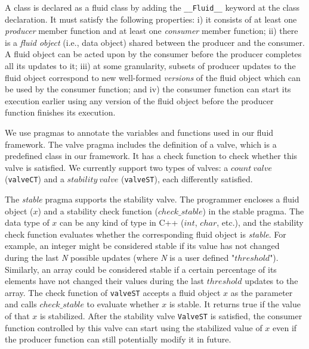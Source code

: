 A class is declared as a fluid class by adding the \texttt{\_\_Fluid\_\_} keyword at the class declaration. It must satisfy the following properties: i) it consists of at least one \textit{producer} member function and at least one \textit{consumer} member function; ii) there is a \textit{fluid object} (i.e., data object) shared between the producer and the consumer. A fluid object can be acted upon by the consumer before the producer completes all its updates to it; iii) at some granularity, subsets of producer updates to the fluid object correspond to new well-formed {\it versions} of the fluid object which can be used by the consumer function; and iv) the consumer function can start its execution earlier using any version of the fluid object before the producer function finishes its execution. 

 We use pragmas to annotate the variables and functions used in our fluid framework. The valve pragma includes the definition of a valve, which is a predefined class in our framework. It has a check function to check whether this valve is satisfied. We currently support two types of valves: a $count\ valve$ ({\tt valveCT}) and a $stability\ valve$ ({\tt valveST}), each differently satisfied.


The \textit{stable} pragma supports the stability valve. The programmer encloses a fluid object ($x$) and a stability check function ($check\_stable$) in the stable pragma. The data type of $x$ can be any kind of type in C++ ($int$, $char$, etc.), and the stability check function evaluates whether the corresponding fluid object is \textit{stable}. For example, an integer might be considered stable if its value has not changed during the last \textit{N} possible updates (where \textit{N} is a user defined "$threshold$"). Similarly, an array could be considered stable if a certain percentage of its elements have not changed their values during the last $threshold$ updates to the array. The check function of {\tt valveST} accepts a fluid object $x$ as the parameter and calls $check\_stable$ to evaluate whether $x$ is stable. It returns true if the value of that $x$ is stabilized. After the stability valve {\tt ValveST} is satisfied, the consumer function controlled by this valve can start using the stabilized value of $x$ even if the producer function can still potentially modify it in future.


